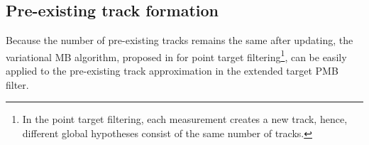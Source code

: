 \documentclass[journal]{IEEEtran}
\begin{document}







\subsection{Pre-existing track formation}
Because the number of pre-existing tracks remains the same after updating, the variational MB algorithm, proposed in \cite{variational} for point target filtering\footnote{In the point target filtering, each measurement creates a new track, hence, different global hypotheses consist of the same number of tracks.}, can be easily applied to the pre-existing track approximation in the extended target PMB filter. 
\end{document}
